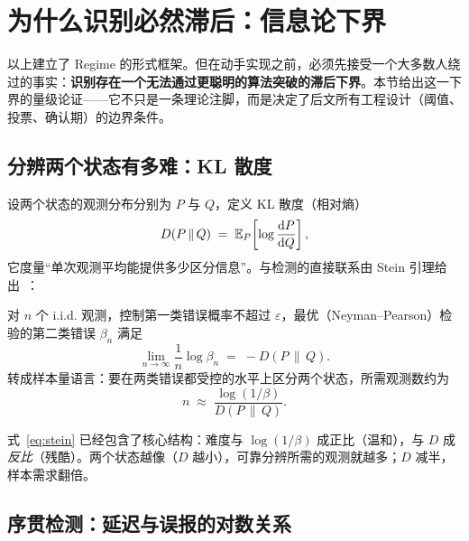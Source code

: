 

\section{为什么识别必然滞后：信息论下界}
\label{sec:bound}

以上建立了 Regime 的形式框架。但在动手实现之前，必须先接受一个大多数人绕过的事实：\textbf{识别存在一个无法通过更聪明的算法突破的滞后下界}。本节给出这一下界的量级论证——它不只是一条理论注脚，而是决定了后文所有工程设计（阈值、投票、确认期）的边界条件。

\subsection{分辨两个状态有多难：KL 散度}

设两个状态的观测分布分别为 $P$ 与 $Q$，定义 KL 散度（相对熵）
\begin{equation}
D(P \,\|\, Q) \;=\; \mathbb{E}_P\!\left[\log \frac{\mathrm{d}P}{\mathrm{d}Q}\right],
\end{equation}
它度量“单次观测平均能提供多少区分信息”。与检测的直接联系由 Stein 引理给出~\cite{cover2006}：

\begin{proposition}
对 $n$ 个 i.i.d. 观测，控制第一类错误概率不超过 $\varepsilon$，最优（Neyman--Pearson）检验的第二类错误 $\beta_n$ 满足
\begin{equation}
\lim_{n\to\infty} \frac{1}{n}\log \beta_n \;=\; -D(P\,\|\,Q).
\end{equation}
转成样本量语言：要在两类错误都受控的水平上区分两个状态，所需观测数约为
\begin{equation}
n \;\approx\; \frac{\log(1/\beta)}{D(P\,\|\,Q)} .
\label{eq:stein}
\end{equation}
\end{proposition}

式~\eqref{eq:stein} 已经包含了核心结构：难度与 $\log(1/\beta)$ 成正比（温和），与 $D$ 成\emph{反比}（残酷）。两个状态越像（$D$ 越小），可靠分辨所需的观测就越多；$D$ 减半，样本需求翻倍。

\subsection{序贯检测：延迟与误报的对数关系}

